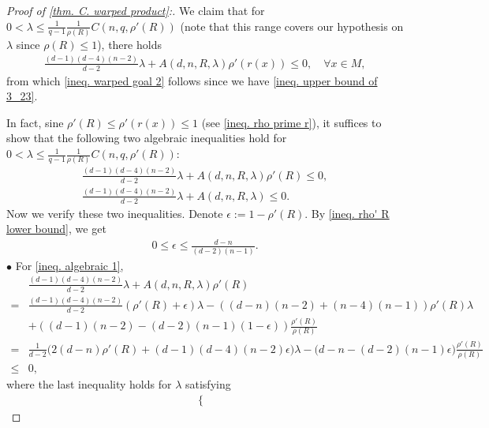 \documentclass[12pt]{amsart}%
\numberwithin{equation}{section}
\numberwithin{lemma}{section}
\numberwithin{proposition}{section}
\numberwithin{corollary}{section}
\numberwithin{remark}{section}
\begin{document}
\begin{proof}[Proof of \cref{thm. C. warped product}:]

    We claim that for $0<\lambda\leq \frac{1}{q-1}\frac{1}{\rho(R)}C(n,q,\rho'(R))$ (note that this range covers our hypothesis on $\lambda$ since $\rho(R)\leq 1$), there holds
    \begin{align*}
        \frac{(d-1)(d-4)(n-2)}{d-2}\lambda
        +A(d,n,R,\lambda)\rho'(r(x))\leq 0,\quad \forall x\in M,
    \end{align*}
    from which \cref{ineq. warped goal 2} follows since we have \cref{ineq. upper bound of 3_23}.

    In fact, sine $\rho'(R)\leq \rho'(r(x))\leq 1$ (see \cref{ineq. rho prime r}), it suffices to show that the following two algebraic inequalities hold for $0<\lambda\leq \frac{1}{q-1}\frac{1}{\rho(R)}C(n,q,\rho'(R))$:
    \begin{align}
        \frac{(d-1)(d-4)(n-2)}{d-2}\lambda
        +A(d,n,R,\lambda)\rho'(R)\leq 0,\label{ineq. algebraic 1}\\
        \frac{(d-1)(d-4)(n-2)}{d-2}\lambda
        +A(d,n,R,\lambda)\leq 0.\label{ineq. algebraic 2}
    \end{align}
    Now we verify these two inequalities. Denote $\epsilon:=1-\rho'(R)$. By \cref{ineq. rho' R lower bound}, we get
    \begin{align*}
        0\leq\epsilon\leq \frac{d-n}{(d-2)(n-1)}.
    \end{align*}
    $\bullet$ For \cref{ineq. algebraic 1},
        \begin{align*}
            &\frac{(d-1)(d-4)(n-2)}{d-2}\lambda
        +A(d,n,R,\lambda)\rho'(R)\\
        =&\frac{(d-1)(d-4)(n-2)}{d-2}(\rho'(R)+\epsilon)\lambda
       -((d-n)(n-2)+(n-4)(n-1))\rho'(R)\lambda\\
        &+
        ((d-1)(n-2)-(d-2)(n-1)(1-\epsilon))
        \frac{\rho'(R)}{\rho(R)}\\
        =&\frac{1}{d-2}\Big(2(d-n)\rho'(R)+(d-1)(d-4)(n-2)\epsilon \Big)\lambda
        -\Big(d-n-(d-2)(n-1)\epsilon\Big)
        \frac{\rho'(R)}{\rho(R)}\\
        \leq& 0,
        \end{align*}
        where the last inequality holds for $\lambda$ satisfying
        \begin{align*}
        \begin{cases}

\end{cases}
\end{align*}
\end{proof}
\end{document}
